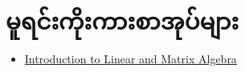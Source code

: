 \section*{မူရင်းကိုးကားစာအုပ်များ}

\begin{itemize}
    \item \href{https://www.amazon.com/Introduction-Linear-Algebra-Nathaniel-Johnston/dp/3030528103}{Introduction to Linear and Matrix Algebra}
\end{itemize}